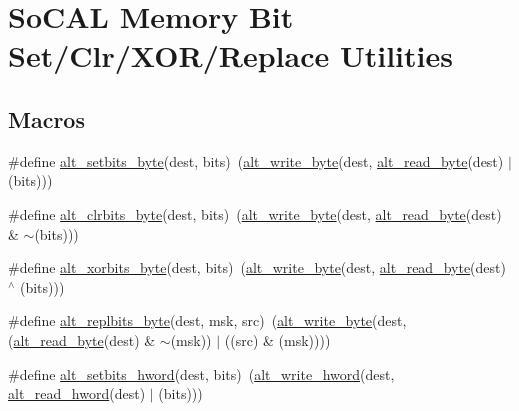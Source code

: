 \hypertarget{group__ALT__SOCAL__UTIL__SC__FUNC}{}\section{So\+C\+AL Memory Bit Set/\+Clr/\+X\+O\+R/\+Replace Utilities}
\label{group__ALT__SOCAL__UTIL__SC__FUNC}
\subsection*{Macros}
\begin{DoxyCompactItemize}
\item 
\#define \mbox{\hyperlink{group__ALT__SOCAL__UTIL__SC__FUNC_ga56b759196b6bbb415fa70e2091357c3f}{alt\+\_\+setbits\+\_\+byte}}(dest,  bits)~(\mbox{\hyperlink{group__ALT__SOCAL__UTIL__RW__FUNC_ga48f504d9c370e45073a9c5e142e1036d}{alt\+\_\+write\+\_\+byte}}(dest, \mbox{\hyperlink{group__ALT__SOCAL__UTIL__RW__FUNC_ga1bf0798969c891f5885170ff2de3ac88}{alt\+\_\+read\+\_\+byte}}(dest) $\vert$ (bits)))
\item 
\#define \mbox{\hyperlink{group__ALT__SOCAL__UTIL__SC__FUNC_gab264eb8a3ca252746a67c2f8082e99f0}{alt\+\_\+clrbits\+\_\+byte}}(dest,  bits)~(\mbox{\hyperlink{group__ALT__SOCAL__UTIL__RW__FUNC_ga48f504d9c370e45073a9c5e142e1036d}{alt\+\_\+write\+\_\+byte}}(dest, \mbox{\hyperlink{group__ALT__SOCAL__UTIL__RW__FUNC_ga1bf0798969c891f5885170ff2de3ac88}{alt\+\_\+read\+\_\+byte}}(dest) \& $\sim$(bits)))
\item 
\#define \mbox{\hyperlink{group__ALT__SOCAL__UTIL__SC__FUNC_gaac23b9846f8fe7a7f7ed26ad9c71c98a}{alt\+\_\+xorbits\+\_\+byte}}(dest,  bits)~(\mbox{\hyperlink{group__ALT__SOCAL__UTIL__RW__FUNC_ga48f504d9c370e45073a9c5e142e1036d}{alt\+\_\+write\+\_\+byte}}(dest, \mbox{\hyperlink{group__ALT__SOCAL__UTIL__RW__FUNC_ga1bf0798969c891f5885170ff2de3ac88}{alt\+\_\+read\+\_\+byte}}(dest) $^\wedge$ (bits)))
\item 
\#define \mbox{\hyperlink{group__ALT__SOCAL__UTIL__SC__FUNC_ga960265a618c5dcf7ab016cbc54c0d3f6}{alt\+\_\+replbits\+\_\+byte}}(dest,  msk,  src)~(\mbox{\hyperlink{group__ALT__SOCAL__UTIL__RW__FUNC_ga48f504d9c370e45073a9c5e142e1036d}{alt\+\_\+write\+\_\+byte}}(dest,(\mbox{\hyperlink{group__ALT__SOCAL__UTIL__RW__FUNC_ga1bf0798969c891f5885170ff2de3ac88}{alt\+\_\+read\+\_\+byte}}(dest) \& $\sim$(msk)) $\vert$ ((src) \& (msk))))
\item 
\#define \mbox{\hyperlink{group__ALT__SOCAL__UTIL__SC__FUNC_ga3cee77f851e1fc8b245ad2c550da80e2}{alt\+\_\+setbits\+\_\+hword}}(dest,  bits)~(\mbox{\hyperlink{group__ALT__SOCAL__UTIL__RW__FUNC_ga68370263143f2bbcae44530837772f50}{alt\+\_\+write\+\_\+hword}}(dest, \mbox{\hyperlink{group__ALT__SOCAL__UTIL__RW__FUNC_gaae69946769b67a9b8bf4f57143b1c4d7}{alt\+\_\+read\+\_\+hword}}(dest) $\vert$ (bits)))

\end{DoxyCompactItemize}
